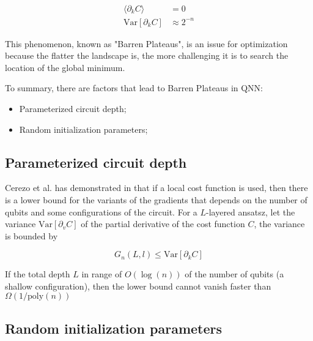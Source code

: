 \begin{align}
    \langle \partial_k C\rangle &= 0  \label{Vanish Gradient}\\
    \mathrm{Var}[\partial_k C] &\approx 2^{-n}  \label{Variance expo smaller}
\end{align}

This phenomenon, known as "Barren Plateaus", is an issue for optimization because the flatter the landscape is, the more challenging it is to search the location of the global minimum.

To summary, there are factors that lead to Barren Plateaus in QNN:
\begin{itemize}
    \item Parameterized circuit depth;
    \item Random initialization parameters;
\end{itemize}

\subsection{Parameterized circuit depth}


Cerezo et al. has demonstrated in \cite{cerezoCostFunctionDependent2021} that if a local cost function is used, then there is a lower bound for the variants of the gradients that depends on the number of qubits and some configurations of the circuit. 
For a $L$-layered ansatsz, let the variance $\mathrm{Var}[\partial_v C]$ of the partial derivative of the cost function $C$, the variance is bounded by

\begin{equation}
    G_n(L,l) \leq \mathrm{Var}[\partial_k C]
\end{equation}

If the total depth $L$ in range of $O(\log(n))$ of the number of qubits (a shallow configuration), then the lower bound cannot vanish faster than $\Omega(1/\mathrm{poly}(n))$

\subsection{Random initialization parameters}